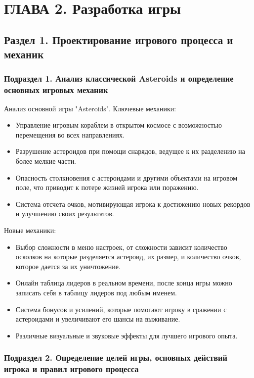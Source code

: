 \chapter{\label{ch:ch02}ГЛАВА 2. Разработка игры}

\section{\label{sec:ch02/sec01}Раздел 1. Проектирование игрового процесса и механик}

\subsection{\label{subsec:ch02/sec01/sub01}Подраздел 1. Анализ классической Asteroids и определение основных игровых механик}

Анализ основной игры "Asteroids". Ключевые механики:
\begin{itemize}
    \item Управление игровым кораблем в открытом космосе с возможностью перемещения во всех направлениях.
    \item Разрушение астероидов при помощи снарядов, ведущее к их разделению на более мелкие части.
    \item Опасность столкновения с астероидами и другими объектами на игровом поле, что приводит к потере жизней игрока или поражению.
    \item Система отсчета очков, мотивирующая игрока к достижению новых рекордов и улучшению своих результатов.
\end{itemize}

Новые механики:
\begin{itemize}
    \item Выбор сложности в меню настроек, от сложности зависит количество осколков на которые разделяется астероид, их размер, и количество очков, которое дается за их уничтожение.
    \item Онлайн таблица лидеров в реальном времени, после конца игры можно записать себя в таблицу лидеров под любым именем.
    \item Система бонусов и усилений, которые помогают игроку в сражении с астероидами и увеличивают его шансы на выживание.
    \item Различные визуальные и звуковые эффекты для лучшего игрового опыта.
\end{itemize}


\subsection{\label{subsec:ch02/sec01/sub02}Подраздел 2. Определение целей игры, основных действий игрока и правил игрового процесса}

